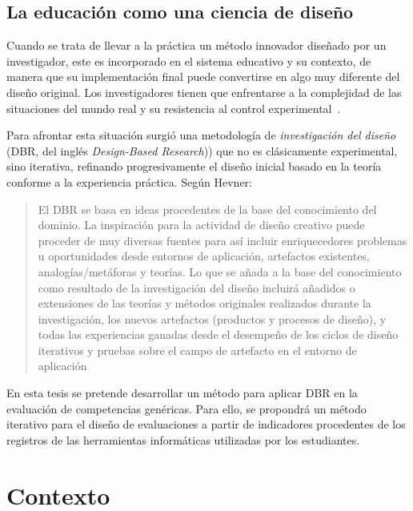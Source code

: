 \subsection*{La educación como una ciencia de diseño}
\label{sec:dbr}

Cuando se trata de llevar a la práctica un método innovador diseñado por un investigador, este es incorporado en el sistema educativo y su contexto, de manera que su implementación final puede convertirse en algo muy diferente del diseño original. Los investigadores tienen que enfrentarse a la complejidad de las situaciones del mundo real y su resistencia al control experimental~\cite{collins2004design}. 



Para afrontar esta situación surgió una metodología de \emph{investigación del diseño} (DBR, del inglés \emph{Design-Based Research})) que no es clásicamente experimental, sino iterativa, refinando progresivamente el diseño inicial basado en la teoría conforme a la experiencia práctica. Según Hevner:
\begin{quote}
El DBR se basa en ideas procedentes de la base del conocimiento del dominio. La inspiración para la actividad de diseño creativo puede proceder de muy diversas fuentes para así incluir enriquecedores problemas u oportunidades desde entornos de aplicación, artefactos existentes, analogías/metáforas y teorías. Lo que se añada a la base del conocimiento como resultado de la investigación del diseño incluirá añadidos o extensiones de las teorías y métodos originales realizados durante la investigación, los nuevos artefactos (productos y procesos de diseño), y todas las experiencias ganadas desde el desempeño de los ciclos de diseño iterativos y pruebas sobre el campo de artefacto en el entorno de aplicación~\cite{hevner2009interview}
\end{quote}

En esta tesis se pretende desarrollar un método para aplicar DBR en la evaluación de competencias genéricas. Para ello, se propondrá un método iterativo para el diseño de evaluaciones a partir de indicadores procedentes de los registros de las herramientas informáticas utilizadas por los estudiantes.

\section{Contexto}
\label{sec:contexto}


